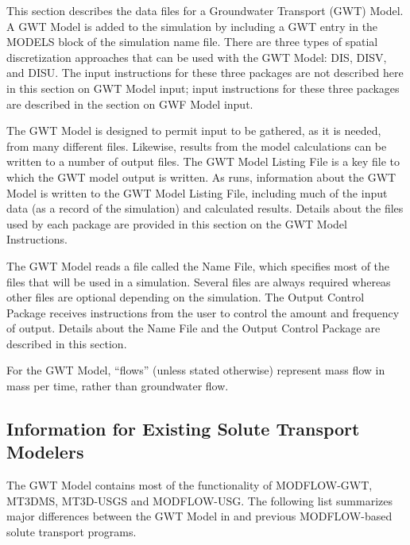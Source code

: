 This section describes the data files for a \mf Groundwater Transport (GWT) Model.  A GWT Model is added to the simulation by including a GWT entry in the MODELS block of the simulation name file.  There are three types of spatial discretization approaches that can be used with the GWT Model: DIS, DISV, and DISU.  The input instructions for these three packages are not described here in this section on GWT Model input; input instructions for these three packages are described in the section on GWF Model input.

The GWT Model is designed to permit input to be gathered, as it is needed, from many different files.  Likewise, results from the model calculations can be written to a number of output files. The GWT Model Listing File is a key file to which the GWT model output is written.  As \mf runs, information about the GWT Model is written to the GWT Model Listing File, including much of the input data (as a record of the simulation) and calculated results.  Details about the files used by each package are provided in this section on the GWT Model Instructions.

The GWT Model reads a file called the Name File, which specifies most of the files that will be used in a simulation. Several files are always required whereas other files are optional depending on the simulation. The Output Control Package receives instructions from the user to control the amount and frequency of output.  Details about the Name File and the Output Control Package are described in this section.

For the GWT Model, ``flows'' (unless stated otherwise) represent mass flow in mass per time, rather than groundwater flow.  

\subsection{Information for Existing Solute Transport Modelers}
The \mf GWT Model contains most of the functionality of MODFLOW-GWT, MT3DMS, MT3D-USGS and MODFLOW-USG.  The following list summarizes major differences between the GWT Model in \mf and previous MODFLOW-based solute transport programs.

